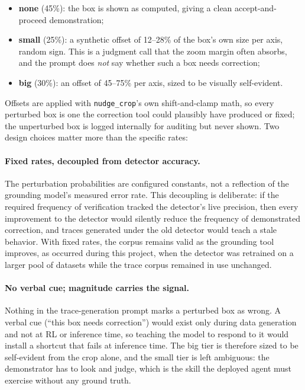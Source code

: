 \begin{itemize}[leftmargin=*,itemsep=1pt,topsep=2pt]
  \item \textbf{none} (45\%): the box is shown as computed, giving a clean accept-and-proceed demonstration;
  \item \textbf{small} (25\%): a synthetic offset of 12--28\% of the box's own size per axis,
  random sign. This is a judgment call that the zoom margin often absorbs, and the
  prompt does \emph{not} say whether such a box needs correction;
  \item \textbf{big} (30\%): an offset of 45--75\% per axis, sized to be visually self-evident.
\end{itemize}

Offsets are applied with \texttt{nudge\_crop}'s own shift-and-clamp math, so every perturbed box
is one the correction tool could plausibly have produced or fixed; the unperturbed box is logged
internally for auditing but never shown. Two design choices matter more than the specific rates:

\paragraph{Fixed rates, decoupled from detector accuracy.}
The perturbation probabilities are configured constants, not a reflection of the grounding
model's measured error rate. This decoupling is deliberate: if the required frequency of verification
tracked the detector's live precision, then every improvement to the detector would
silently reduce the frequency of demonstrated correction, and traces generated under the old
detector would teach a stale behavior. With fixed rates, the corpus remains valid as the
grounding tool improves, as occurred during this project, when the
detector was retrained on a larger pool of datasets while the trace corpus remained in use unchanged.

\paragraph{No verbal cue; magnitude carries the signal.}
Nothing in the trace-generation prompt marks a perturbed box as wrong. A verbal cue (``this box
needs correction'') would exist only during data generation and not at RL or inference time, so
teaching the model to respond to it would install a shortcut that fails at inference time. The
big tier is therefore sized to be self-evident from the crop alone, and the small tier is left
ambiguous: the demonstrator has to look and judge, which is the skill the deployed agent must
exercise without any ground truth.


